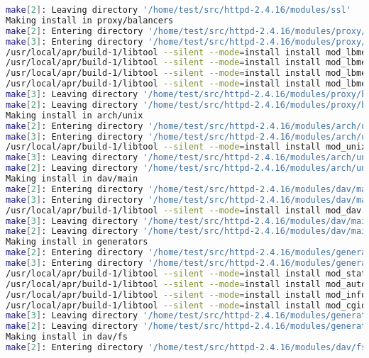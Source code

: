 \begin{lstlisting}[language=bash]
make[2]: Leaving directory '/home/test/src/httpd-2.4.16/modules/ssl'
Making install in proxy/balancers
make[2]: Entering directory '/home/test/src/httpd-2.4.16/modules/proxy/balancers'
make[3]: Entering directory '/home/test/src/httpd-2.4.16/modules/proxy/balancers'
/usr/local/apr/build-1/libtool --silent --mode=install install mod_lbmethod_byrequests.la /usr/local/apache2/modules/
/usr/local/apr/build-1/libtool --silent --mode=install install mod_lbmethod_bytraffic.la /usr/local/apache2/modules/
/usr/local/apr/build-1/libtool --silent --mode=install install mod_lbmethod_bybusyness.la /usr/local/apache2/modules/
/usr/local/apr/build-1/libtool --silent --mode=install install mod_lbmethod_heartbeat.la /usr/local/apache2/modules/
make[3]: Leaving directory '/home/test/src/httpd-2.4.16/modules/proxy/balancers'
make[2]: Leaving directory '/home/test/src/httpd-2.4.16/modules/proxy/balancers'
Making install in arch/unix
make[2]: Entering directory '/home/test/src/httpd-2.4.16/modules/arch/unix'
make[3]: Entering directory '/home/test/src/httpd-2.4.16/modules/arch/unix'
/usr/local/apr/build-1/libtool --silent --mode=install install mod_unixd.la /usr/local/apache2/modules/
make[3]: Leaving directory '/home/test/src/httpd-2.4.16/modules/arch/unix'
make[2]: Leaving directory '/home/test/src/httpd-2.4.16/modules/arch/unix'
Making install in dav/main
make[2]: Entering directory '/home/test/src/httpd-2.4.16/modules/dav/main'
make[3]: Entering directory '/home/test/src/httpd-2.4.16/modules/dav/main'
/usr/local/apr/build-1/libtool --silent --mode=install install mod_dav.la /usr/local/apache2/modules/
make[3]: Leaving directory '/home/test/src/httpd-2.4.16/modules/dav/main'
make[2]: Leaving directory '/home/test/src/httpd-2.4.16/modules/dav/main'
Making install in generators
make[2]: Entering directory '/home/test/src/httpd-2.4.16/modules/generators'
make[3]: Entering directory '/home/test/src/httpd-2.4.16/modules/generators'
/usr/local/apr/build-1/libtool --silent --mode=install install mod_status.la /usr/local/apache2/modules/
/usr/local/apr/build-1/libtool --silent --mode=install install mod_autoindex.la /usr/local/apache2/modules/
/usr/local/apr/build-1/libtool --silent --mode=install install mod_info.la /usr/local/apache2/modules/
/usr/local/apr/build-1/libtool --silent --mode=install install mod_cgid.la /usr/local/apache2/modules/
make[3]: Leaving directory '/home/test/src/httpd-2.4.16/modules/generators'
make[2]: Leaving directory '/home/test/src/httpd-2.4.16/modules/generators'
Making install in dav/fs
make[2]: Entering directory '/home/test/src/httpd-2.4.16/modules/dav/fs'

\end{lstlisting}
